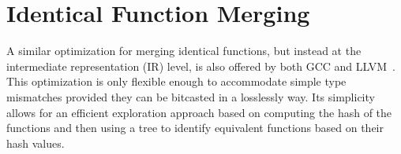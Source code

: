 \section{Identical Function Merging}


A similar optimization for merging identical functions, but instead at the
intermediate representation (IR) level, is also offered by both GCC and
LLVM~\cite{llvm-fm,livska14}.
This optimization is only flexible enough to accommodate simple type mismatches
provided they can be bitcasted in a losslessly way.
Its simplicity allows for an efficient exploration approach based on computing
the hash of the functions and then using a tree to identify equivalent functions
based on their hash values.

